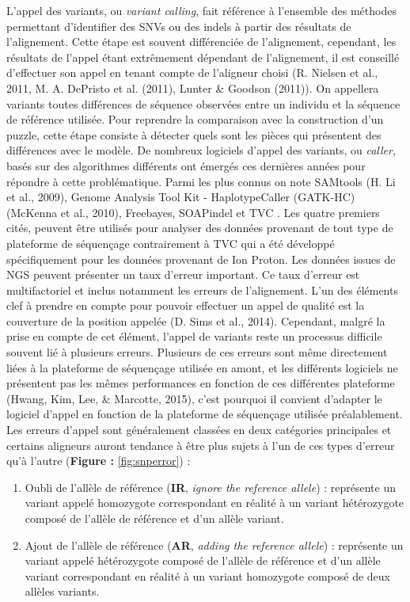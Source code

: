 \documentclass[12pt,twoside]{reedthesis}
\providecommand{\tightlist}{%
  \setlength{\itemsep}{0pt}\setlength{\parskip}{0pt}}
\theoremstyle{definition}
\theoremstyle{definition}
\theoremstyle{remark}
\begin{document}
  L'appel des variants, ou \emph{variant calling}, fait référence à
  l'ensemble des méthodes permettant d'identifier des SNVs ou des indels à
  partir des résultats de l'alignement. Cette étape est souvent
  différenciée de l'alignement, cependant, les résultats de l'appel étant
  extrêmement dépendant de l'alignement, il est conseillé d'effectuer son
  appel en tenant compte de l'aligneur choisi (R. Nielsen et al., 2011, M.
  A. DePristo et al. (2011), Lunter \& Goodson (2011)). On appellera
  variants toutes différences de séquence observées entre un individu et
  la séquence de référence utilisée. Pour reprendre la comparaison avec la
  construction d'un puzzle, cette étape consiste à détecter quels sont les
  pièces qui présentent des différences avec le modèle. De nombreux
  logiciels d'appel des variants, ou \emph{caller}, basés sur des
  algorithmes différents ont émergés ces dernières années pour répondre à
  cette problématique. Parmi les plus connus on note SAMtools (H. Li et
  al., 2009), Genome Analysis Tool Kit - HaplotypeCaller (GATK-HC)
  (McKenna et al., 2010), Freebayes, SOAPindel et TVC . Les quatre
  premiers cités, peuvent être utilisés pour analyser des données
  provenant de tout type de plateforme de séquençage contrairement à TVC
  qui a été développé spécifiquement pour les données provenant de Ion
  Proton. Les données issues de NGS peuvent présenter un taux d'erreur
  important. Ce taux d'erreur est multifactoriel et inclus notamment les
  erreurs de l'alignement. L'un des éléments clef à prendre en compte pour
  pouvoir effectuer un appel de qualité est la couverture de la position
  appelée (D. Sims et al., 2014). Cependant, malgré la prise en compte de
  cet élément, l'appel de variants reste un processus difficile souvent
  lié à plusieurs erreurs. Plusieurs de ces erreurs sont même directement
  liées à la plateforme de séquençage utilisée en amont, et les différents
  logiciels ne présentent pas les mêmes performances en fonction de ces
  différentes plateforme (Hwang, Kim, Lee, \& Marcotte, 2015), c'est
  pourquoi il convient d'adapter le logiciel d'appel en fonction de la
  plateforme de séquençage utilisée préalablement. Les erreurs d'appel
  sont généralement classées en deux catégories principales et certains
  aligneurs auront tendance à être plus sujets à l'un de ces types
  d'erreur qu'à l'autre (\textbf{Figure : }\ref{fig:snperror}) :
  
  \begin{enumerate}
  \def\labelenumi{\arabic{enumi}.}
  \tightlist
  \item
    Oubli de l'allèle de référence (\textbf{IR}, \emph{ignore the
    reference allele}) : représente un variant appelé homozygote
    correspondant en réalité à un variant hétérozygote composé de l'allèle
    de référence et d'un allèle variant.\\
  \item
    Ajout de l'allèle de référence (\textbf{AR}, \emph{adding the
    reference allele}) : représente un variant appelé hétérozygote composé
    de l'allèle de référence et d'un allèle variant correspondant en
    réalité à un variant homozygote composé de deux allèles variants.\\
  \end{enumerate}
  
\end{document}
